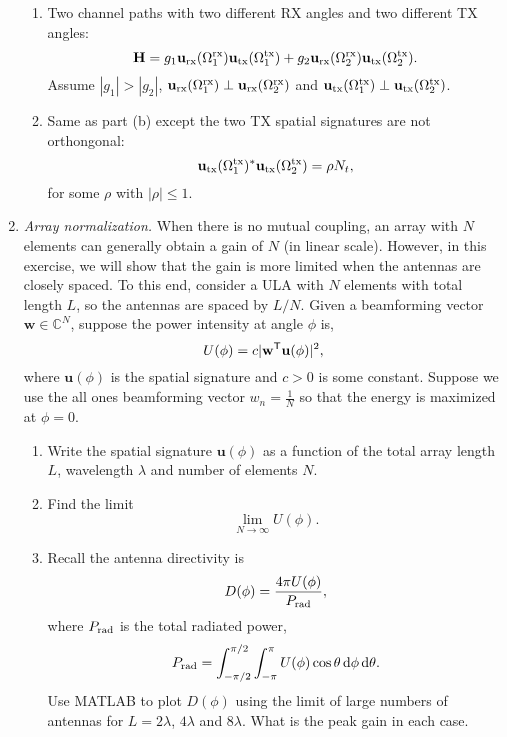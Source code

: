 \documentclass[11pt]{article}
\def\C{{\mathbb{C}}}
\newcommand{\ubf}{\mathbf{u}}
\newcommand{\wbf}{\mathbf{w}}
\newcommand{\Hbf}{\mathbf{H}}
\newcommand{\tran}{^{\text{\sf T}}}
\begin{document}
\begin{enumerate}
\begin{enumerate}[label=(\alph*)]
\item Two channel paths with two different RX angles 
and two different TX angles:
\[
    \Hbf = g_1
        \ubf_{\rm rx}(\Omega_1^{\rm rx}) \ubf_{\rm tx}(\Omega_1^{\rm tx}) +
        g_2 \ubf_{\rm rx}(\Omega_2^{\rm rx}) \ubf_{\rm tx}(\Omega_2^{\rm tx}).
\]
Assume $|g_1| > |g_2|$, $\ubf_{\rm rx}(\Omega_1^{\rm rx}) \perp \ubf_{\rm rx}(\Omega_2^{\rm rx})$ and $\ubf_{\rm tx}(\Omega_1^{\rm tx}) \perp \ubf_{\rm tx}(\Omega_2^{\rm tx})$.

\item Same as part (b) except the two TX spatial signatures are not orthongonal:
\[
    \ubf_{\rm tx}(\Omega_1^{\rm tx})^*\ubf_{\rm tx}(\Omega_2^{\rm tx})  =\rho N_t,
\]
for some $\rho$ with $|\rho|\leq 1$.

\end{enumerate}

\item \emph{Array normalization.}  When there is no mutual coupling,
an array with $N$ elements can generally obtain a gain of $N$ (in linear scale).
However, in this exercise, we will show that the gain is more limited when the
antennas are closely spaced.  To this end, consider a  ULA with $N$ elements
with total length $L$, so the antennas are spaced by $L/N$.   
Given a beamforming vector $\wbf \in \C^N$,
suppose the power intensity at angle $\phi$ is,
\[
    U(\phi) = c|\wbf\tran \ubf(\phi)|^2,
\]
where $\ubf(\phi)$ is the spatial signature and $c > 0$ is some constant.
Suppose we use the all ones beamforming vector $w_n = \frac{1}{N}$ so that the 
energy is maximized at $\phi = 0$.
\begin{enumerate}[label=(\alph*)]
\item Write the spatial signature $\ubf(\phi)$ as a function of the total array length
$L$, wavelength $\lambda$ and number of elements $N$.

\item Find the limit 
\[
    \lim_{N \rightarrow \infty} U(\phi).
\]

\item Recall the antenna directivity is
\[
    D(\phi) = \frac{4\pi U(\phi)}{P_{\rm rad}},
\]
where $P_{\rm rad}$ is the total radiated power,
\[
    P_{\rm rad} = \int_{-\pi/2}^{\pi/2} \int_{-\pi}^{\pi} U(\phi)\cos \theta \,
        \dd \phi \,\dd \theta.
\]
Use MATLAB to plot $D(\phi)$ using the limit of large numbers of antennas for $L=2\lambda$, 
$4\lambda$ and $8\lambda$.  What is the peak gain in each case.


\end{enumerate}




\end{enumerate}
\end{document}
